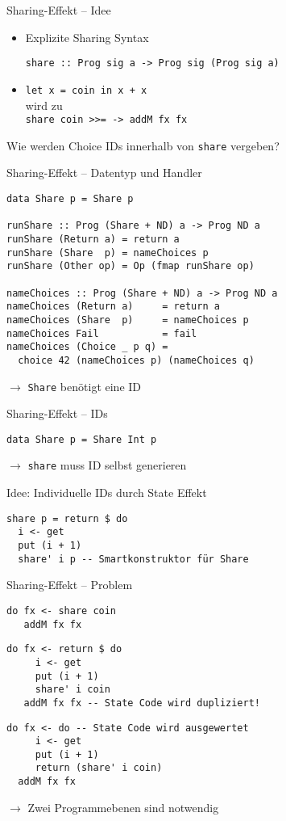 \documentclass{beamer}
\newcommand{\haskellinline}[1]{\texttt{#1}}
\begin{document}
\begin{frame}[fragile]{Sharing-Effekt -- Idee}
\begin{itemize}
\item Explizite Sharing Syntax 
\begin{verbatim}
share :: Prog sig a -> Prog sig (Prog sig a)
\end{verbatim}
\item \haskellinline{let x = coin in x + x} \\
      wird zu\\
      \haskellinline{share coin >>= \fx -> addM fx fx}
\end{itemize}
Wie werden Choice IDs innerhalb von \haskellinline{share} vergeben?
\end{frame}

\begin{frame}[fragile]{Sharing-Effekt -- Datentyp und Handler}
\begin{verbatim}
data Share p = Share p

runShare :: Prog (Share + ND) a -> Prog ND a
runShare (Return a) = return a
runShare (Share  p) = nameChoices p
runShare (Other op) = Op (fmap runShare op)

nameChoices :: Prog (Share + ND) a -> Prog ND a
nameChoices (Return a)     = return a
nameChoices (Share  p)     = nameChoices p
nameChoices Fail           = fail
nameChoices (Choice _ p q) =
  choice 42 (nameChoices p) (nameChoices q)
\end{verbatim}
$\rightarrow$ \haskellinline{Share} benötigt eine ID
\end{frame}

\begin{frame}[fragile]{Sharing-Effekt -- IDs}
\begin{verbatim}
data Share p = Share Int p
\end{verbatim}
$\rightarrow$ \haskellinline{share} muss ID selbst generieren

Idee: Individuelle IDs durch \alert{State Effekt}
\begin{verbatim}
share p = return $ do
  i <- get
  put (i + 1)
  share' i p -- Smartkonstruktor für Share
\end{verbatim}
\end{frame}

\begin{frame}[fragile]{Sharing-Effekt -- Problem}
\begin{verbatim}
do fx <- share coin
   addM fx fx
\end{verbatim}

\begin{verbatim}
do fx <- return $ do
     i <- get
     put (i + 1)
     share' i coin
   addM fx fx -- State Code wird dupliziert!
\end{verbatim}
\pause
\begin{verbatim}
do fx <- do -- State Code wird ausgewertet
     i <- get
     put (i + 1)
     return (share' i coin)
  addM fx fx
\end{verbatim}
$\rightarrow$ Zwei Programmebenen sind notwendig
\end{frame}
\end{document}
